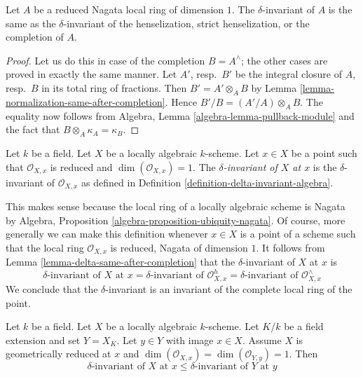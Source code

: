 \begin{lemma}
\label{lemma-delta-same-after-completion}
Let $A$ be a reduced Nagata local ring of dimension $1$.
The $\delta$-invariant of $A$ is the same as the
$\delta$-invariant of the henselization, strict henselization,
or the completion of $A$.
\end{lemma}

\begin{proof}
Let us do this in case of the completion $B = A^\wedge$;
the other cases are proved in exactly the same manner.
Let $A'$, resp.\ $B'$ be the integral closure of $A$, resp.\ $B$
in its total ring of fractions.
Then $B' = A' \otimes_A B$ by
Lemma \ref{lemma-normalization-same-after-completion}.
Hence $B'/B = (A'/A) \otimes_A B$.
The equality now follows from
Algebra, Lemma \ref{algebra-lemma-pullback-module}
and the fact that $B \otimes_A \kappa_A = \kappa_B$.
\end{proof}

\begin{definition}
\label{definition-delta-invariant}
Let $k$ be a field. Let $X$ be a locally algebraic $k$-scheme.
Let $x \in X$ be a point such that $\mathcal{O}_{X, x}$
is reduced and $\dim(\mathcal{O}_{X, x}) = 1$.
The {\it $\delta$-invariant of $X$ at $x$} is the
$\delta$-invariant of $\mathcal{O}_{X, x}$ as defined in
Definition \ref{definition-delta-invariant-algebra}.
\end{definition}

\noindent
This makes sense because the local ring of a locally
algebraic scheme is Nagata by
Algebra, Proposition \ref{algebra-proposition-ubiquity-nagata}.
Of course, more generally we can make this definition
whenever $x \in X$ is a point of a scheme such that
the local ring $\mathcal{O}_{X, x}$ is reduced, Nagata of dimension $1$.
It follows from Lemma \ref{lemma-delta-same-after-completion}
that the $\delta$-invariant of $X$ at $x$ is
$$
\delta\text{-invariant of }X\text{ at }x =
\delta\text{-invariant of }\mathcal{O}_{X, x}^h =
\delta\text{-invariant of }\mathcal{O}_{X, x}^\wedge
$$
We conclude that the $\delta$-invariant is an invariant
of the complete local ring of the point.

\begin{lemma}
\label{lemma-delta-invariant-and-change-of-fields}
Let $k$ be a field. Let $X$ be a locally algebraic $k$-scheme.
Let $K/k$ be a field extension and set $Y = X_K$.
Let $y \in Y$ with image $x \in X$.
Assume $X$ is geometrically reduced at $x$ and
$\dim(\mathcal{O}_{X, x}) = \dim(\mathcal{O}_{Y, y}) = 1$.
Then
$$
\delta\text{-invariant of }X\text{ at }x \leq
\delta\text{-invariant of }Y\text{ at }y
$$
\end{lemma}

